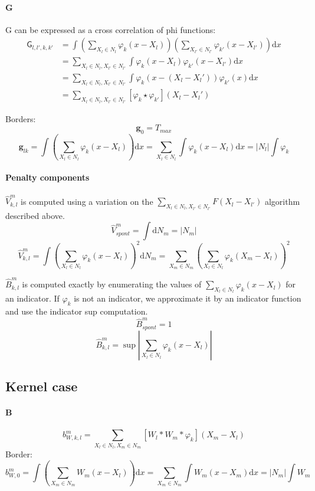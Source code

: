 \documentclass[a4paper,10pt]{article}
\newcommand\D{\mathrm{d}}
\newcommand\Convolution{\ast}
\newcommand\Correlation{\star}
\begin{document}
\paragraph{G}
G can be expressed as a cross correlation of phi functions:
\[ \begin{split}
    \mathsf{G}_{l,l',k,k'}
    & = \int \left( \sum_{X_l \in N_l} \varphi_k(x-X_l) \right) \left( \sum_{X_{l'} \in N_{l'}} \varphi_{k'}(x-X_{l'}) \right) \D x \\
    & = \sum_{X_l \in N_l, X_{l'} \in N_{l'}} \int \varphi_k(x-X_l) \varphi_{k'}(x-X_{l'}) \D x \\
    & = \sum_{X_l \in N_l, X_{l'} \in N_{l'}} \int \varphi_k(x-(X_l-X_l')) \varphi_{k'}(x) \D x \\
    & = \sum_{X_l \in N_l, X_{l'} \in N_{l'}} [\varphi_k \Correlation \varphi_{k'}] (X_l-X_l')
\end{split} \]

Borders:
\[ \mathbf{g}_0 = T_{max} \]
\[ \mathbf{g}_{lk}
    = \int \left( \sum_{X_l \in N_l} \varphi_k(x - X_l) \right) \D x
    = \sum_{X_l \in N_l} \int \varphi_k(x - X_l) \D x
    = |N_l| \int \varphi_k
\]

\paragraph{Penalty components}
$\widehat{V}_{k,l}^m$ is computed using a variation on the $\sum_{X_l \in N_l, X_{l'} \in N_{l'}} F(X_l-X_{l'})$ algorithm described above.
\[ \widehat{V}_{spont}^m = \int \D N_m = |N_m| \]
\[
    \widehat{V}_{k,l}^m =
    \int \left( \sum_{X_l \in N_l} \varphi_k(x-X_l) \right)^2 \D N_m =
    \sum_{X_m \in N_m} \left( \sum_{X_l \in N_l} \varphi_k(X_m-X_l) \right)^2
\]

$\widehat{B}_{k,l}^m$ is computed exactly by enumerating the values of $\sum_{X_l \in N_l} \varphi_k(x - X_l)$ for an indicator.
If $\varphi_k$ is not an indicator, we approximate it by an indicator function and use the indicator sup computation.
\[ \widehat{B}_{spont}^m = 1 \]
\[ \widehat{B}_{k,l}^m = \sup |\sum_{X_l \in N_l} \varphi_k(x - X_l)| \]

\subsection{Kernel case}

\paragraph{B}
\[ b_{W,k,l}^m = \sum_{X_l \in N_l, X_m \in N_m} [W_l \Convolution W_m \Convolution \varphi_k] (X_m - X_l) \]
Border:
\[
    b_{W,0}^m 
    = \int \left( \sum_{X_m \in N_m} W_m(x - X_l) \right) \D x
    = \sum_{X_m \in N_m} \int W_m(x - X_m) \D x
    = |N_m| \int W_m
\]
\end{document}

